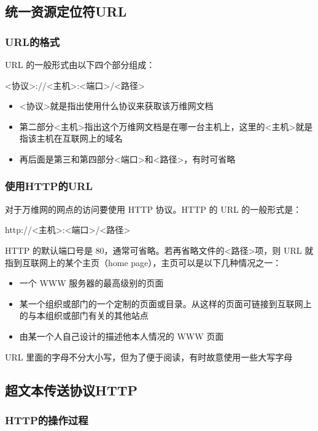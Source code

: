 \documentclass[cs4size,a4paper,10pt]{ctexart}
\begin{document}
	\subsection{统一资源定位符URL}

	\subsubsection{URL的格式}
	URL 的一般形式由以下四个部分组成：
	\begin{center}
		<协议>://<主机>:<端口>/<路径>
	\end{center}

	\begin{itemize}
		\item <协议>就是指出使用什么协议来获取该万维网文档
		\item 第二部分<主机>指出这个万维网文档是在哪一台主机上，这里的<主机>就是指该主机在互联网上的域名
		\item 再后面是第三和第四部分<端口>和<路径>，有时可省略
	\end{itemize}

	\subsubsection{使用HTTP的URL}
	对于万维网的网点的访问要使用 HTTP 协议。HTTP 的 URL 的一般形式是：
	\begin{center}
		http://<主机>:<端口>/<路径>
	\end{center}

	HTTP 的默认端口号是 80，通常可省略。若再省略文件的<路径>项，则 URL 就指到互联网上的某个主页（home page），主页可以是以下几种情况之一：
	\begin{itemize}
		\item 一个 WWW 服务器的最高级别的页面
		\item 某一个组织或部门的一个定制的页面或目录。从这样的页面可链接到互联网上的与本组织或部门有关的其他站点
		\item 由某一个人自己设计的描述他本人情况的 WWW 页面
	\end{itemize}

	URL 里面的字母不分大小写，但为了便于阅读，有时故意使用一些大写字母

	\subsection{超文本传送协议HTTP}

	\subsubsection{HTTP的操作过程}
\end{document}

